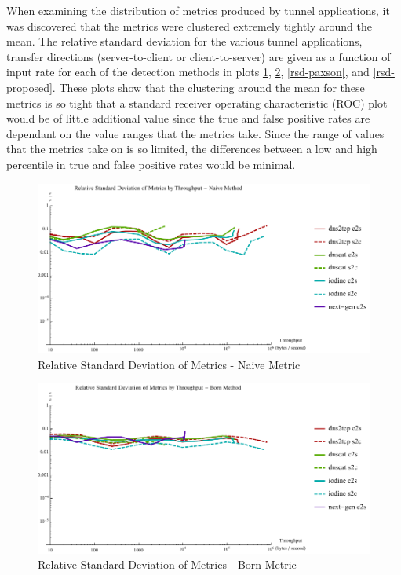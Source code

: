 \documentclass[12pt]{report}
\theoremstyle{remark}
\theoremstyle{definition}
\theoremstyle{definition}
\theoremstyle{definition}
\begin{document}
When examining the distribution of metrics produced by tunnel applications, it
was discovered that the metrics were clustered extremely tightly around the
mean. The relative standard deviation for the various tunnel applications,
transfer directions (server-to-client or client-to-server) are given as a
function of input rate for each of the detection methods in plots
\ref{rsd-naive}, \ref{rsd-born}, \ref{rsd-paxson}, and \ref{rsd-proposed}. These
plots show that the clustering around the mean for these metrics is so tight
that a standard receiver operating characteristic (ROC) plot would be of little
additional value since the true and false positive rates are dependant on the
value ranges that the metrics take. Since the range of values that the metrics
take on is so limited, the differences between a low and high percentile in true
and false positive rates would be minimal.

\begin{figure}
\centering
\includegraphics[width=\textwidth]{figures/rsd-naive.pdf}
\caption[Relative Standard Deviation of Metrics - Naive Metric]{Relative Standard Deviation of Metrics - Naive Metric}
\label{rsd-naive}
\end{figure}

\begin{figure}
\centering
\includegraphics[width=\textwidth]{figures/rsd-born.pdf}
\caption[Relative Standard Deviation of Metrics - Born Metric]{Relative Standard Deviation of Metrics - Born Metric}
\label{rsd-born}
\end{figure}
\end{document}
